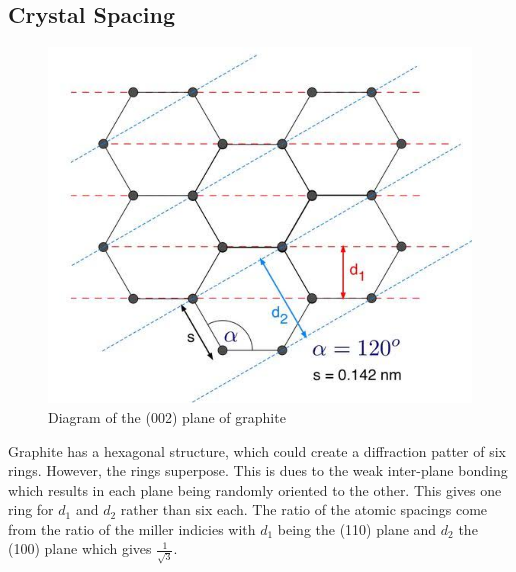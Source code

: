 \documentclass[11pt,letterpaper,onecolumn]{article}
\begin{document}
\subsection{Crystal Spacing}

\begin{figure}[H]
 \begin{center}
 \includegraphics*[scale = 0.5]{GeoStructure.jpg}
 \caption{Diagram of the (002) plane of graphite\label{fig:struct}}
 \end{center}
\end{figure}

Graphite has a hexagonal structure, which could create a diffraction patter of six rings. However, the rings superpose. This is dues to the weak inter-plane bonding which results in each plane being randomly oriented to the other. This gives one ring for $d_1$ and $d_2$ rather than six each. The ratio of the atomic spacings come from the ratio of the miller indicies with $d_1$ being the (110) plane and $d_2$ the (100) plane which gives $\frac{1}{\sqrt{3}}$.~\cite{EDF,UM}
\end{document}
